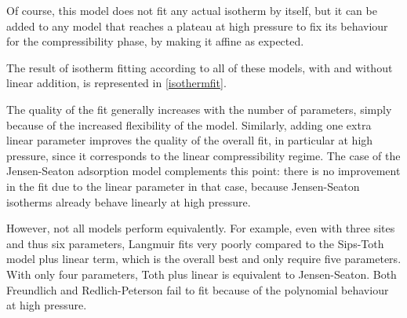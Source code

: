 \documentclass[main.tex]{subfiles}
\begin{document}
Of course, this model does not fit any actual isotherm by itself, but it can be added to any model that reaches a plateau at high pressure to fix its behaviour for the compressibility phase, by making it affine as expected.

The result of isotherm fitting according to all of these models, with and without linear addition, is represented in \cref{isothermfit}.

The quality of the fit generally increases with the number of parameters, simply because of the increased flexibility of the model. Similarly, adding one extra linear parameter improves the quality of the overall fit, in particular at high pressure, since it corresponds to the linear compressibility regime. The case of the Jensen-Seaton adsorption model complements this point: there is no improvement in the fit due to the linear parameter in that case, because Jensen-Seaton isotherms already behave linearly at high pressure.

However, not all models perform equivalently. For example, even with three sites and thus six parameters, Langmuir fits very poorly compared to the Sips-Toth model plus linear term, which is the overall best and only require five parameters. With only four parameters, Toth plus linear is equivalent to Jensen-Seaton. Both Freundlich and Redlich-Peterson fail to fit because of the polynomial behaviour at high pressure. 
\end{document}
